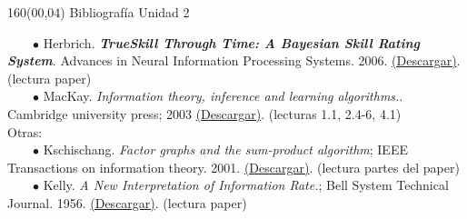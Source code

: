 \documentclass[shownotes,aspectratio=169]{beamer}
\begin{document}
\begin{frame}[plain]
\begin{textblock}{160}(00,04)
\centering \LARGE Bibliografía Unidad 2
\end{textblock}
\vspace{1cm} \normalsize
%
\ \ \ \ $\bullet$ Herbrich. \textbf{\textit{TrueSkill Through Time: A Bayesian Skill Rating System}}. Advances in Neural Information Processing Systems. 2006. \href{https://papers.nips.cc/paper/3079-trueskilltm-a-bayesian-skill-rating-system.pdf}{(Descargar)}. (lectura paper) \\[0.2cm]

\ \ \ \ $\bullet$ MacKay. \textit{Information theory, inference and learning algorithms.}. Cambridge university press; 2003 \href{https://github.com/glandfried/biblio/releases/download/teca/mackay2003}{(Descargar)}. (lecturas 1.1, 2.4-6, 4.1)  \\[0.75cm]


Otras: \\[0.1cm]

\ \ \ \ $\bullet$ Kschischang. \textit{Factor graphs and the sum-product algorithm}; IEEE Transactions on information theory. 2001. \href{http://www.cs.utoronto.ca/~radford/csc2506/factor.pdf}{(Descargar)}. (lectura partes del paper) \\[0.2cm]

\ \ \ \ $\bullet$ Kelly. \textit{A New Interpretation of Information Rate.}; Bell System Technical Journal. 1956. \href{https://github.com/glandfried/biblio/releases/download/teca/kelly1956-informationRate}{(Descargar)}. (lectura paper) \\[0.2cm]


\end{frame}
\end{document}
